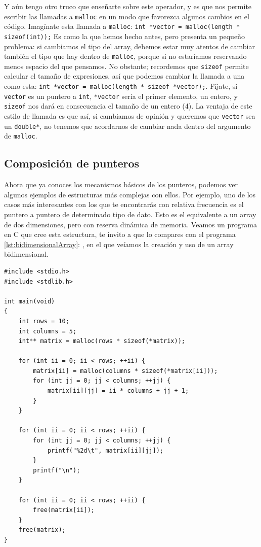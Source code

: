 \documentclass[a4paper]{article}
\begin{document}
Y aún tengo otro truco que enseñarte sobre este operador, y es que nos permite
escribir las llamadas a \verb!malloc! en un modo que favorezca algunos cambios
en el código. Imagínate esta llamada a \verb!malloc!:
\lstinline[style=C]{int *vector = malloc(length * sizeof(int));} Es como la
que hemos hecho antes, pero presenta un pequeño problema: si cambiamos el tipo
del array, debemos estar muy atentos de cambiar también el tipo que hay dentro
de \verb!malloc!, porque si no estaríamos reservando menos espacio del que
pensamos. No obstante; recordemos que \verb!sizeof! permite calcular el tamaño de
expresiones, así que podemos cambiar la llamada a una como esta:
\lstinline[style=C]{int *vector = malloc(length * sizeof *vector);}. Fíjate,
si \verb!vector! es un puntero a \verb!int!, \verb!*vector! sería el primer
elemento, un entero, y \verb!sizeof! nos dará en consecuencia el tamaño de un
entero (4). La ventaja de este estilo de llamada es que así, si cambiamos de
opinión y queremos que \verb!vector! sea un \verb!double*!, no tenemos que
acordarnos de cambiar nada dentro del argumento de \verb!malloc!.

\subsection{Composición de punteros}
Ahora que ya conoces los mecanismos básicos de los punteros, podemos ver algunos
ejemplos de estructuras más complejas con ellos. Por ejemplo, uno de los casos
más interesantes con los que te encontrarás con relativa frecuencia es el
puntero a puntero de determinado tipo de dato. Esto es el equivalente a un
array de dos dimensiones, pero con reserva dinámica de memoria. Veamos un
programa en C que cree esta estructura, te invito a que lo compares con el
programa \ref{lst:bidimensionalArray}: , en el
que veíamos la creación y uso de un array bidimensional.

\noindent
\begin{minipage}[H]{\linewidth}
\mbox{}
\begin{lstlisting}[style=C,
caption={Reserva, uso y liberación de un vector de vectores},
label={lst:bidimensionalVector}]
#include <stdio.h>
#include <stdlib.h>

int main(void)
{
    int rows = 10;
    int columns = 5;
    int** matrix = malloc(rows * sizeof(*matrix));

    for (int ii = 0; ii < rows; ++ii) {
        matrix[ii] = malloc(columns * sizeof(*matrix[ii]));
        for (int jj = 0; jj < columns; ++jj) {
            matrix[ii][jj] = ii * columns + jj + 1;
        }
    }

    for (int ii = 0; ii < rows; ++ii) {
        for (int jj = 0; jj < columns; ++jj) {
            printf("%2d\t", matrix[ii][jj]);
        }
        printf("\n");
    }

    for (int ii = 0; ii < rows; ++ii) {
        free(matrix[ii]);
    }
    free(matrix);
}
\end{lstlisting}
\end{minipage}
\end{document}
